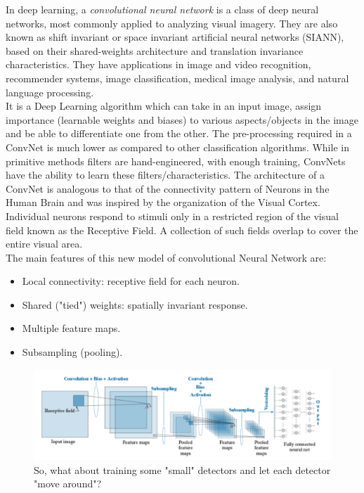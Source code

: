 \documentclass[12pt]{report}
\theoremstyle{plain}
\begin{document}
\begin{flushleft}
In deep learning, a \textit{convolutional neural network} is a class of deep neural networks, most commonly applied to analyzing visual imagery. They are also known as shift invariant or space invariant artificial neural networks (SIANN), based on their shared-weights architecture and translation invariance characteristics. They have applications in image and video recognition, recommender systems, image classification, medical image analysis, and natural language processing.\\
It is a Deep Learning algorithm which can take in an input image, assign importance (learnable weights and biases) to various aspects/objects in the image and be able to differentiate one from the other. The pre-processing required in a ConvNet is much lower as compared to other classification algorithms. While in primitive methods filters are hand-engineered, with enough training, ConvNets have the ability to learn these filters/characteristics. The architecture of a ConvNet is analogous to that of the connectivity pattern of Neurons in the Human Brain and was inspired by the organization of the Visual Cortex. Individual neurons respond to stimuli only in a restricted region of the visual field known as the Receptive Field. A collection of such fields overlap to cover the entire visual area.\\
The main features of this new model of convolutional Neural Network are:
\begin{itemize}
	\item Local connectivity: receptive field for each neuron.
	\item Shared ("tied") weights: spatially invariant response.
	\item Multiple feature maps.
	\item Subsampling (pooling).
\end{itemize}

\begin{figure}[!h]
	\centering
	\includegraphics[scale=0.7]{images/convNN_scheme.pdf}
	\caption{So, what about training some "small" detectors and let each detector "move around"?}
	\label{fig:convNN_scheme}
\end{figure}


\end{flushleft}
\end{document}
